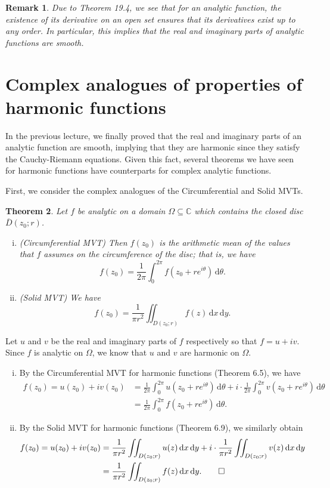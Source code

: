 \documentclass[10pt]{article}
\makeatletter
\newcommand{\C}{\mathbb{C}}
\newcommand{\dd}{\,\mathrm{d}}
\theoremstyle{newstyle}
\newtheorem{thm}{Theorem}[section]
\newtheorem{remark}[thm]{Remark}
\newenvironment{pf}[1][\proofname]{\par
  \pushQED{\qed}%
  \normalfont \topsep0\p@\relax
  \trivlist
  \item[\hskip\labelsep\scshape
  #1\@addpunct{.}]\ignorespaces
}{%
  \popQED\endtrivlist\@endpefalse
}
\makeatother
\begin{document}
\begin{remark}
Due to Theorem 19.4, we see that for an analytic function, the existence of its 
derivative on an open set ensures that its derivatives exist up to any order. 
In particular, this implies that the real and imaginary parts of analytic functions are smooth.
\end{remark}

\newpage 
\section{Complex analogues of properties of harmonic functions}

In the previous lecture, we finally proved that the real and imaginary parts of an analytic 
function are smooth, implying that they are harmonic since they satisfy the 
Cauchy-Riemann equations. Given this fact, several theorems we have seen for 
harmonic functions have counterparts for complex analytic functions. 

First, we consider the complex analogues of the Circumferential and Solid MVTs. 

\begin{thm}
Let $f$ be analytic on a domain $\Omega \subseteq \C$ which contains the closed disc $\overline{D}(z_0; r)$. 
\begin{enumerate}[(i)]
    \item (Circumferential MVT) Then $f(z_0)$ is the arithmetic mean of the values that $f$ 
    assumes on the circumference of the disc; that is, we have 
    \[ f(z_0) = \frac{1}{2\pi} \int_0^{2\pi} f(z_0 + re^{i\theta})\dd \theta. \]
    \item (Solid MVT) We have 
    \[ f(z_0) = \frac{1}{\pi r^2} \iint_{D(z_0; r)} f(z)\dd x \dd y. \]
\end{enumerate}
\end{thm}
\begin{pf}
Let $u$ and $v$ be the real and imaginary parts of $f$ respectively so that $f = u + iv$. 
Since $f$ is analytic on $\Omega$, we know that $u$ and $v$ are harmonic on $\Omega$. 
\begin{enumerate}[(i)]
    \item By the Circumferential MVT for harmonic functions (Theorem 6.5), we have 
    \begin{align*} f(z_0) = u(z_0) + iv(z_0) 
    &= \frac{1}{2\pi} \int_0^{2\pi} u(z_0 + re^{i\theta}) \dd \theta + i 
    \cdot \frac{1}{2\pi} \int_0^{2\pi} v(z_0 + re^{i\theta}) \dd \theta \\
    &= \frac{1}{2\pi} \int_0^{2\pi} f(z_0 + re^{i\theta})\dd \theta. \end{align*}
    \item By the Solid MVT for harmonic functions (Theorem 6.9), we similarly obtain 
    \begin{align*} f(z_0) = u(z_0) + iv(z_0) 
    &= \frac{1}{\pi r^2} \iint_{D(z_0; r)} u(z)\dd x \dd y + i 
    \cdot \frac{1}{\pi r^2} \iint_{D(z_0; r)} v(z)\dd x \dd y \\
    &= \frac{1}{\pi r^2} \iint_{D(z_0; r)} f(z)\dd x \dd y. \qedhere \end{align*} 
    \end{enumerate}
\end{pf}
\end{document}
